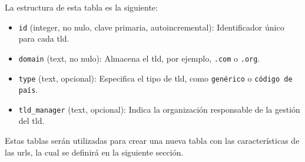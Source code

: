 La estructura de esta tabla es la siguiente:
\begin{itemize}
    \item \texttt{id} (integer, no nulo, clave primaria, autoincremental): Identificador único para cada \gls{tld}.
    \item \texttt{domain} (text, no nulo): Almacena el \gls{tld}, por ejemplo, \texttt{.com} o \texttt{.org}.
    \item \texttt{type} (text, opcional): Especifica el tipo de \gls{tld}, como \texttt{genérico} o \texttt{código de país}.
    \item \texttt{tld\_manager} (text, opcional): Indica la organización responsable de la gestión del \gls{tld}.
\end{itemize}

Estas tablas serán utilizadas para crear una nueva tabla con las características de las \glspl{url}, la cual se definirá en la siguiente sección.

